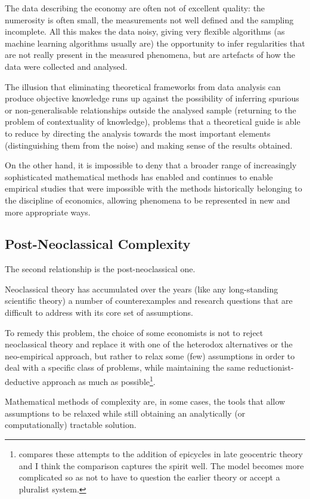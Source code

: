 \documentclass[a4paper, headings=standardclasses]{scrartcl}
\begin{document}
The data describing the economy are often not of excellent quality: the numerosity is often small, the measurements not well defined and the sampling incomplete.
All this makes the data noisy, giving very flexible algorithms (as machine learning algorithms usually are) the opportunity to infer regularities that are not really present in the measured phenomena, but are artefacts of how the data were collected and analysed.

The illusion that eliminating theoretical frameworks from data analysis can produce objective knowledge runs up against the possibility of inferring spurious or non-generalisable relationships outside the analysed sample (returning to the problem of contextuality of knowledge), problems that a theoretical guide is able to reduce by directing the analysis towards the most important elements (distinguishing them from the noise) and making sense of the results obtained.

On the other hand, it is impossible to deny that a broader range of increasingly sophisticated mathematical methods has enabled and continues to enable empirical studies that were impossible with the methods historically belonging to the discipline of economics, allowing phenomena to be represented in new and more appropriate ways.

\subsection{Post-Neoclassical Complexity}
The second relationship is the post-neoclassical one.

Neoclassical theory has accumulated over the years (like any long-standing scientific theory) a number of counterexamples and research questions that are difficult to address with its core set of assumptions.

To remedy this problem, the choice of some economists is not to reject neoclassical theory and replace it with one of the heterodox alternatives or the neo-empirical approach, but rather to relax some (few) assumptions in order to deal with a specific class of problems, while maintaining the same reductionist-deductive approach as much as possible\footnote{\textcite{kanazawa2021} compares these attempts to the addition of epicycles in late geocentric theory and I think the comparison captures the spirit well. The model becomes more complicated so as not to have to question the earlier theory or accept a pluralist system.}.

Mathematical methods of complexity are, in some cases, the tools that allow assumptions to be relaxed while still obtaining an analytically (or computationally) tractable solution.
\end{document}
